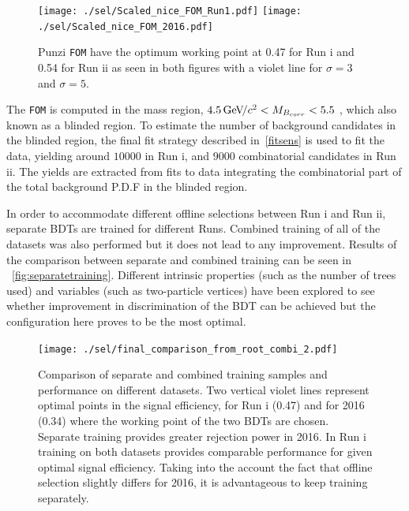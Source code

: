 \begin{figure}[ht]
\centering
	\texttt{[image: ./sel/Scaled\_nice\_FOM\_Run1.pdf]}%
	\texttt{[image: ./sel/Scaled\_nice\_FOM\_2016.pdf]}%
	\caption{ Punzi \texttt{FOM} have the optimum working point at 0.47 for Run \Rn{1} and 0.54 for Run \Rn{2} as seen in both figures with a violet line for $\sigma=3$ and $\sigma=5$.}
\label{fig:punzifom}
\end{figure}


The \texttt{FOM} is computed in the mass region, $4.5{\mathrm{\,Ge\kern -0.1em V\!/}c^2} <M_{B_{corr}} <5.5$ \gevcc, which also known as a blinded region. To estimate the number of background candidates in the blinded region, the final fit strategy described in~\autoref{fitsens} is used to fit the data, yielding around $10000$ in Run \Rn{1}, and $9000$ combinatorial candidates in Run \Rn{2}. The yields are extracted from fits to data integrating the combinatorial part of the total background P.D.F in the blinded region.

In order to accommodate different offline selections between Run \Rn{1} and Run \Rn{2}, separate BDTs are trained for different Runs. Combined training of all of the datasets was also performed but it does not lead to any improvement. Results of the comparison between separate and combined training can be seen in ~\autoref{fig:separatetraining}. Different intrinsic properties (such as the number of trees used) and variables (such as two-particle vertices) have been explored to see whether improvement in discrimination of the BDT can be achieved but the configuration here proves to be the most optimal.


\begin{figure}[ht]
\centering
\texttt{[image: ./sel/final\_comparison\_from\_root\_combi\_2.pdf]}
	\caption{Comparison of separate and combined training samples and performance on different datasets. Two vertical violet lines represent optimal points in the signal efficiency, for Run \Rn{1} (0.47) and for 2016 (0.34) where the working point of the two BDTs are chosen. Separate training provides greater rejection power in 2016. In Run \Rn{1} training on both datasets provides comparable performance for given optimal signal efficiency. Taking into the account the fact that offline selection slightly differs for 2016, it is advantageous to keep training separately.}
\label{fig:separatetraining}
\end{figure}





